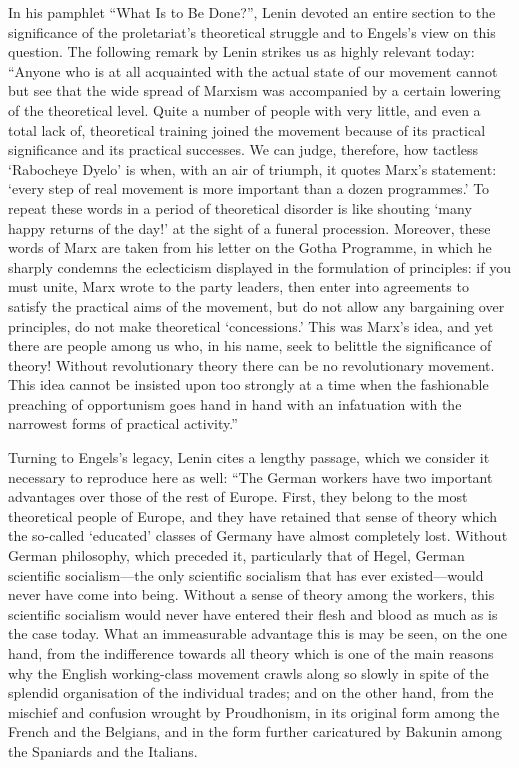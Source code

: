 \documentclass[../main]{subfiles}
\begin{document}
In his pamphlet “What Is to Be Done?”, Lenin devoted an entire section to the significance of the proletariat’s theoretical struggle and to Engels’s view on this question. The following remark by Lenin strikes us as highly relevant today: “Anyone who is at all acquainted with the actual state of our movement cannot but see that the wide spread of Marxism was accompanied by a certain lowering of the theoretical level. Quite a number of people with very little, and even a total lack of, theoretical training joined the movement because of its practical significance and its practical successes. We can judge, therefore, how tactless ‘Rabocheye Dyelo’ is when, with an air of triumph, it quotes Marx’s statement: ‘every step of real movement is more important than a dozen programmes.’ To repeat these words in a period of theoretical disorder is like shouting ‘many happy returns of the day!’ at the sight of a funeral procession. Moreover, these words of Marx are taken from his letter on the Gotha Programme, in which he sharply condemns the eclecticism displayed in the formulation of principles: if you must unite, Marx wrote to the party leaders, then enter into agreements to satisfy the practical aims of the movement, but do not allow any bargaining over principles, do not make theoretical ‘concessions.’ This was Marx’s idea, and yet there are people among us who, in his name, seek to belittle the significance of theory! Without revolutionary theory there can be no revolutionary movement. This idea cannot be insisted upon too strongly at a time when the fashionable preaching of opportunism goes hand in hand with an infatuation with the narrowest forms of practical activity.”

Turning to Engels’s legacy, Lenin cites a lengthy passage, which we consider it necessary to reproduce here as well: “The German workers have two important advantages over those of the rest of Europe. First, they belong to the most theoretical people of Europe, and they have retained that sense of theory which the so-called ‘educated’ classes of Germany have almost completely lost. Without German philosophy, which preceded it, particularly that of Hegel, German scientific socialism—the only scientific socialism that has ever existed—would never have come into being. Without a sense of theory among the workers, this scientific socialism would never have entered their flesh and blood as much as is the case today. What an immeasurable advantage this is may be seen, on the one hand, from the indifference towards all theory which is one of the main reasons why the English working-class movement crawls along so slowly in spite of the splendid organisation of the individual trades; and on the other hand, from the mischief and confusion wrought by Proudhonism, in its original form among the French and the Belgians, and in the form further caricatured by Bakunin among the Spaniards and the Italians.
\end{document}
